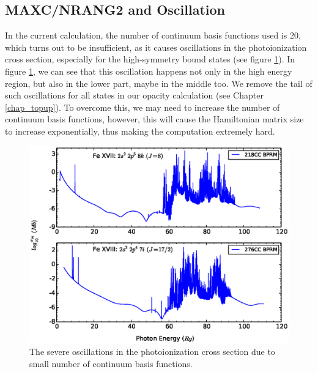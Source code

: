 \subsection{MAXC/NRANG2 and Oscillation} \label{sec_nrang2_oscillation}
In the current calculation, the number of continuum basis functions used is 20, which turns out to be insufficient, as it causes oscillations in the photoionization cross section, especially for the high-symmetry bound states (see figure \ref{figure_oscillation}). In figure \ref{figure_oscillation}, we can see that this oscillation happens not only in the high energy region, but also in the lower part, maybe in the middle too. We remove the tail of such oscillations for all states in our opacity calculation (see Chapter \ref{chap_topup}). To overcome this, we may need to increase the number of continuum basis functions, however, this will cause the Hamiltonian matrix size to increase exponentially, thus making the computation extremely hard.
\begin{figure}
	\centering
	\includegraphics[width=.9\textwidth]{figures_chap_4/oscillation}	
	\caption{The severe oscillations in the photoionization cross section due to small number of continuum basis functions.}
	\label{figure_oscillation}
\end{figure}

